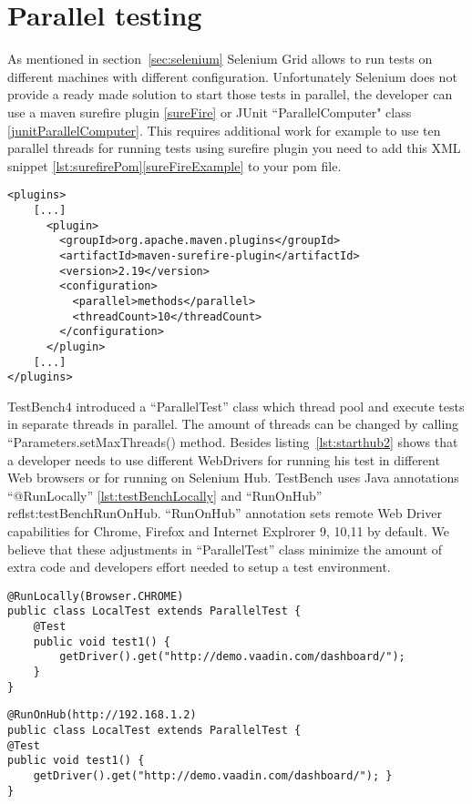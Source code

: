 \section{Parallel testing}
\label{paralelTesting}
As mentioned in section~\ref{sec:selenium} Selenium Grid allows to run
tests on different machines with different configuration. Unfortunately
Selenium does not provide a ready made solution to start those tests in
parallel, the developer can  use a maven surefire plugin \ref{sureFire} 
or JUnit ``ParallelComputer" class \ref{junitParallelComputer}. This requires
additional work for example to use ten parallel threads for running tests using
surefire plugin you need to add this XML snippet \ref{lst:surefirePom}\ref{sureFireExample}
to your pom file.

\lstset{language=XML}
\begin{lstlisting}[caption=Get Vaadin Table cell Value,label={lst:surefirePom}]
<plugins>
    [...]
      <plugin>
        <groupId>org.apache.maven.plugins</groupId>
        <artifactId>maven-surefire-plugin</artifactId>
        <version>2.19</version>
        <configuration>
          <parallel>methods</parallel>
          <threadCount>10</threadCount>
        </configuration>
      </plugin>
    [...]
</plugins>
\end{lstlisting}	

TestBench4 introduced a ``ParallelTest'' class which thread pool and execute tests
in separate threads in parallel. The amount of threads can be changed by
calling ``Parameters.setMaxThreads() method. Besides listing~\ref{lst:starthub2}
shows that a developer needs to use different WebDrivers for running his test in
different Web browsers or for running on Selenium Hub. TestBench uses Java
annotations ``@RunLocally'' \ref{lst:testBenchLocally} and ``RunOnHub''
ref{lst:testBenchRunOnHub}.
``RunOnHub'' annotation sets remote Web Driver capabilities for Chrome, Firefox and Internet Explrorer 9,
10,11 by default. We believe that these adjustments in ``ParallelTest'' class
minimize the amount of extra code and developers effort needed to setup a test
environment.
\lstset{language=Java}
\begin{lstlisting}[caption=Run test in local Chrome browser locally,label={lst:testBenchLocally}] 
@RunLocally(Browser.CHROME)
public class LocalTest extends ParallelTest { 
	@Test
	public void test1() {
		getDriver().get("http://demo.vaadin.com/dashboard/");
	}
}
\end{lstlisting}

\lstset{language=Java}
\begin{lstlisting}[caption=Run tests on Selenium hub on http://192.168.1.2, label={lst:testBenchRunOnHub}]
@RunOnHub(http://192.168.1.2)
public class LocalTest extends ParallelTest {
@Test
public void test1() {
	getDriver().get("http://demo.vaadin.com/dashboard/"); }
}
\end{lstlisting}

